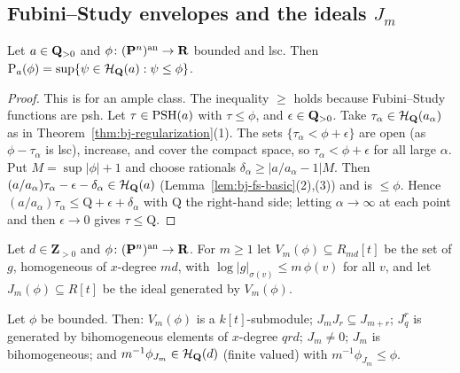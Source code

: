 \subsection{Fubini--Study envelopes and the ideals \texorpdfstring{$J_m$}{Jm}}

\begin{lemma}\label{lem:bj-fs-envelope}
\leanok
{}
Let $a\in\mathbf{Q}_{>0}$ and $\phi\colon(\mathbf{P}^n)^{\mathrm{an}}\to\mathbf{R}$ bounded and lsc. Then
$\mathrm P_a(\phi)=\sup\{\psi\in\mathcal H_{\mathbf{Q}}(a):\psi\le\phi\}$.
\end{lemma}

\begin{proof}
This is \cite[Lemma~1.5]{BJadd} for an ample class. The inequality $\ge$ holds because Fubini--Study
functions are psh. Let $\tau\in\operatorname{PSH}(a)$ with $\tau\le\phi$, and $\epsilon\in\mathbf{Q}_{>0}$. Take
$\tau_\alpha\in\mathcal H_{\mathbf{Q}}(a_\alpha)$ as in Theorem~\ref{thm:bj-regularization}(1). The sets
$\{\tau_\alpha<\phi+\epsilon\}$ are open (as $\phi-\tau_\alpha$ is lsc), increase, and cover the compact
space, so $\tau_\alpha<\phi+\epsilon$ for all large $\alpha$. Put $M=\sup|\phi|+1$ and choose rationals
$\delta_\alpha\ge|a/a_\alpha-1|M$. Then $(a/a_\alpha)\tau_\alpha-\epsilon-\delta_\alpha\in\mathcal H_{\mathbf{Q}}(a)$
(Lemma~\ref{lem:bj-fs-basic}(2),(3)) and is $\le\phi$. Hence $(a/a_\alpha)\tau_\alpha\le\mathrm Q+\epsilon+\delta_\alpha$
with $\mathrm Q$ the right-hand side; letting $\alpha\to\infty$ at each point and then $\epsilon\to0$ gives
$\tau\le\mathrm Q$.
\end{proof}

\begin{definition}\label{def:bj-Jm}
\leanok
{}
Let $d\in\mathbf{Z}_{>0}$ and $\phi\colon(\mathbf{P}^n)^{\mathrm{an}}\to\mathbf{R}$. For $m\ge1$ let $V_m(\phi)\subseteq R_{md}[t]$ be the set of
$g$, homogeneous of $x$-degree $md$, with $\log|g|_{\sigma(v)}\le m\,\phi(v)$ for all $v$, and let
$J_m(\phi)\subseteq R[t]$ be the ideal generated by $V_m(\phi)$.
\end{definition}

\begin{lemma}[Properties of $J_m$]\label{lem:bj-Jm-basic}
\leanok
{}
Let $\phi$ be bounded. Then: $V_m(\phi)$ is a $k[t]$-submodule; $J_mJ_r\subseteq J_{m+r}$; $J_q^r$ is
generated by bihomogeneous elements of $x$-degree $qrd$; $J_m\ne0$; $J_m$ is bihomogeneous; and
$m^{-1}\phi_{J_m}\in\mathcal H_{\mathbf{Q}}(d)$ (finite valued) with $m^{-1}\phi_{J_m}\le\phi$.
\end{lemma}

